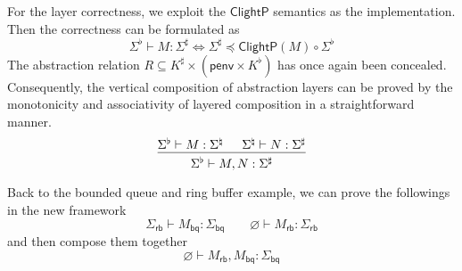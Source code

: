 \documentclass[acmsmall,screen,review,anonymous]{acmart}
\newcommand{\kw}[1]{\ensuremath{ \mathsf{#1} }}
\renewcommand{\preceq}{\preccurlyeq}
\newcommand{\ClightP}{\ensuremath{ \mathsf{ClightP} }}
\begin{document}
For the layer correctness,
we exploit the $\ClightP$ semantics as the implementation.
Then the correctness can be formulated as
\[
  \Sigma^\flat \vdash M : \Sigma^\sharp
  \Leftrightarrow
  \Sigma^\sharp \preceq \ClightP(M) \circ \Sigma^\flat
\]
The abstraction relation
$R \subseteq K^\sharp \times (\kw{penv} \times K^\flat)$
has once again been concealed.
Consequently, the vertical composition of abstraction layers
can be proved
by the monotonicity and associativity of layered composition
in a straightforward manner.
\[
  \begin{prooftree}
    \hypo{\Sigma^\flat \vdash M : \Sigma^\natural}
    \hypo{\Sigma^\natural \vdash N : \Sigma^\sharp}
    \infer2{\Sigma^\flat \vdash M, N : \Sigma^\sharp}
  \end{prooftree}
\]

Back to the bounded queue and ring buffer example,
we can prove the followings in the new framework
\[
  \Sigma_\kw{rb} \vdash M_\kw{bq} : \Sigma_\kw{bq}
  \qquad
  \varnothing \vdash M_\kw{rb} : \Sigma_\kw{rb}
\]
and then compose them together
\[
  \varnothing \vdash M_\kw{rb}, M_\kw{bq} : \Sigma_\kw{bq}
\]
\end{document}
